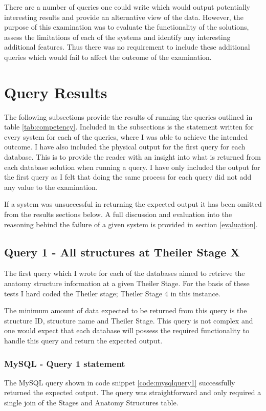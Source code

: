 There are a number of queries one could write which would output potentially interesting results and provide an alternative view of the data. However, the purpose of this examination was to evaluate the functionality of the solutions, assess the limitations of each of the systems and identify any interesting additional features. Thus there was no requirement to include these additional queries which would fail to affect the outcome of the examination.

\section{Query Results}\label{queryresults}
The following subsections provide the results of running the queries outlined in table \ref{tab:competency}. Included in the subsections is the statement written for every system for each of the queries, where I was able to achieve the intended outcome. I have also included the physical output for the first query for each database. This is to provide the reader with an insight into what is returned from each database solution when running a query. I have only included the output for the first query as I felt that doing the same process for each query did not add any value to the examination.

If a system was unsuccessful in returning the expected output it has been omitted from the results sections below. A full discussion and evaluation into the reasoning behind the failure of a given system is provided in section \ref{evaluation}.

\subsection*{Query 1 - All structures at Theiler Stage X}\label{query1}
The first query which I wrote for each of the databases aimed to retrieve the anatomy structure information at a given Theiler Stage. For the basis of these tests I hard coded the Theiler stage; Theiler Stage 4 in this instance.

The minimum amount of data expected to be returned from this query is the structure ID, structure name and Theiler Stage. This query is not complex and one would expect that each database will possess the required functionality to handle this query and return the expected output.

\subsubsection*{MySQL - Query 1 statement}\label{mysqlquery1statement}
The MySQL query shown in code snippet \ref{code:mysqlquery1} successfully returned the expected output. The query was straightforward and only required a single join of the Stages and Anatomy Structures table.

